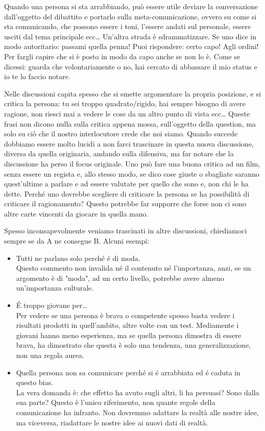 \documentclass[12pt]{book} %
\begin{document}
Quando una persona si sta arrabbiando, può essere utile deviare la conversazione dall'oggetto del dibattito e portarlo sulla meta-comunicazione, ovvero su come si sta comunicando, che possono essere i toni, l'essere andati sul personale, essere usciti dal tema principale ecc… 
Un'altra strada è sdrammatizzare. Se uno dice in modo autoritario: passami quella penna! Puoi rispondere: certo capo! Agli ordini! Per fargli capire che si è posto in modo da capo anche se non lo è. Come se dicessi: guarda che volontariamente o no, hai cercato di abbassare il mio status e io te lo faccio notare.

Nelle discussioni capita spesso che si smette argomentare la propria posizione, e si critica la persona: tu sei troppo quadrato/rigido, hai sempre bisogno di avere ragione, non riesci mai a vedere le cose da un altro punto di vista ecc… Queste frasi non dicono nulla sulla critica appena mossa, sull'oggetto della question, ma solo su ciò che il nostro interlocutore crede che noi siamo. Quando succede dobbiamo essere molto lucidi a non farci trascinare in questa nuova discussione, diversa da quella originaria, andando sulla difensiva, ma far notare che la discussione ha perso il focus originale. Uno può fare una buona critica ad un film, senza essere un regista e, allo stesso modo, se dico cose giuste o sbagliate saranno quest'ultime a parlare e ad essere valutate per quello che sono e, non chi le ha dette. Perché uno dovrebbe scegliere di criticare la persona se ha possibilità di criticare il ragionamento? Questo potrebbe far supporre che forse non ci sono altre carte vincenti da giocare in quella mano.

Spesso inconsapevolmente veniamo trascinati in altre discussioni, chiediamoci sempre se da A ne consegue B.
Alcuni esempi:
\begin{itemize}
\item Tutti ne parlano solo perché é di moda. \\
Questo commento non invalida né il contenuto né l'importanza, anzi, se un argomento è di "moda", ad un certo livello, potrebbe avere almeno un'importanza culturale.
\item É troppo giovane per… \\
Per vedere se una persona è brava o competente spesso basta vedere i risultati prodotti in quell'ambito, altre volte con un test. Mediamente i giovani hanno meno esperienza, ma se quella persona dimostra di essere brava, ha dimostrato che questa è solo una tendenza, una generalizzazione, non una regola aurea.
\item Quella persona non sa comunicare perché si é arrabbiata ed é caduta in questo bias.\\
La vera domanda è: che effetto ha avuto sugli altri, li ha persuasi? Sono dalla sua parte? Questo è l'unico riferimento, non quante regole della comunicazione ha infranto. Non dovremmo adattare la realtà alle nostre idee, ma viceversa, riadattare le nostre idee ai nuovi dati di realtà.
\end{itemize}
\end{document}
